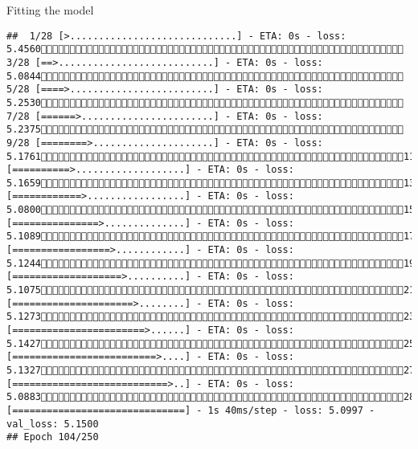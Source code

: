 \documentclass[
  ignorenonframetext,
]{beamer}
\begin{document}
\begin{frame}[fragile]{Fitting the model}
\begin{verbatim}
##  1/28 [>.............................] - ETA: 0s - loss: 5.4560 3/28 [==>...........................] - ETA: 0s - loss: 5.0844 5/28 [====>.........................] - ETA: 0s - loss: 5.2530 7/28 [======>.......................] - ETA: 0s - loss: 5.2375 9/28 [========>.....................] - ETA: 0s - loss: 5.176111/28 [==========>...................] - ETA: 0s - loss: 5.165913/28 [============>.................] - ETA: 0s - loss: 5.080015/28 [===============>..............] - ETA: 0s - loss: 5.108917/28 [=================>............] - ETA: 0s - loss: 5.124419/28 [===================>..........] - ETA: 0s - loss: 5.107521/28 [=====================>........] - ETA: 0s - loss: 5.127323/28 [=======================>......] - ETA: 0s - loss: 5.142725/28 [=========================>....] - ETA: 0s - loss: 5.132727/28 [===========================>..] - ETA: 0s - loss: 5.088328/28 [==============================] - 1s 40ms/step - loss: 5.0997 - val_loss: 5.1500
## Epoch 104/250

\end{verbatim}
\end{frame}
\end{document}
